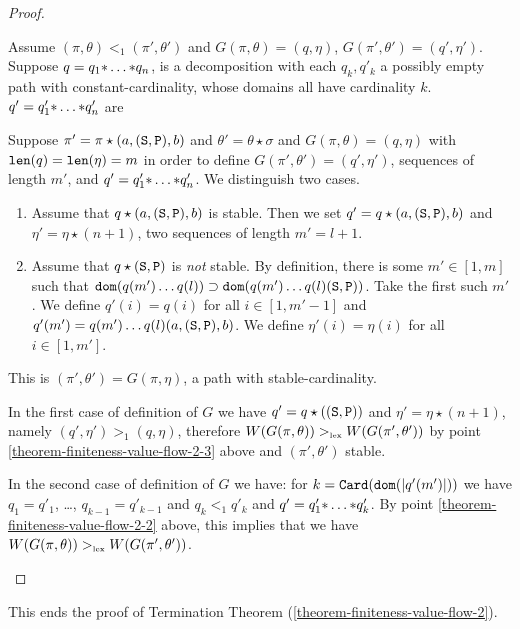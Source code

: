 \documentclass{lmcs}
\begin{document}
\begin{proof}
\begin{enumerate}

Assume $(\pi,\theta) <_1 (\pi',\theta')$ and  $G(\pi,\theta) = (q,\eta)$, 
$G(\pi',\theta') = (q',\eta')$. Suppose $q= q_1 {*} \ldots {*} q_n$,
is a decomposition with each $q_k, q'_k$
a possibly empty path  with constant-cardinality, 
whose domains all have cardinality $k$.
$q' = q'_1 {*} \ldots {*} q'_n$ are 

Suppose $\pi' = \pi \star (a,({\tt S},{\tt P}),b)$ and $\theta' = \theta \star \sigma$
and $G(\pi,\theta) = (q,\eta)$ with ${\mbox{\tt len}}(q) = {\mbox{\tt len}}(\eta) = m$ in order to
define $G(\pi',\theta') = (q',\eta')$, sequences of length $m'$,
and $q' = q'_1 {*} \ldots {*} q'_n$. 
We distinguish two cases.

\begin{enumerate}
\item
Assume that $q \star (a,({\tt S},{\tt P}),b)$ is stable. 
Then we set $q' = q \star (a,({\tt S},{\tt P}),b)$ and $\eta' = \eta \star (n+1)$,
two sequences of length $m' = l+1$. 

\item
Assume that $q \star ({\tt S},{\tt P})$ is \emph{not} stable. 
By definition, there is some $m' \in[1,m]$ such that 
$
{\tt dom}(q(m') \ldots q(l))
\supset 
{\tt dom}(q(m') \ldots q(l) ({\tt S},{\tt P}))
$. Take the first such $m'$.
We define $q'(i) =  q(i)$ for all $i \in [1,m'-1]$ and
$q'(m') = q(m') \ldots q(l)  (a,({\tt S},{\tt P}),b)$.
We define $\eta'(i) = \eta(i)$ for all $i \in [1,m']$. 
\end{enumerate}
This is $(\pi',\theta')=G(\pi,\eta)$, a path with stable-cardinality. 

In the first case of definition of $G$ we have 
$q' = q \star (({\tt S},{\tt P}))$ and $\eta' = \eta \star (n+1)$, namely
$(q',\eta') >_1 (q,\eta)$, therefore $W(G(\pi,\theta)) >_{\mbox{\tiny lex}} W(G(\pi',\theta'))$
by point \ref{theorem-finiteness-value-flow-2-3} 
above and $(\pi',\theta')$ stable.

In the second case of definition of $G$ we have: 
for $k = {\tt Card}({\tt dom}({| q'(m') |}))$ we have 
$q_1 = q'_1$, \ldots, $q_{k-1} = q'_{k-1}$ and $q_k <_1 q'_k$ and 
$q' = q'_1 {*} \ldots {*} q'_k$. By point \ref{theorem-finiteness-value-flow-2-2} above, 
this implies that we have $W(G(\pi,\theta)) >_{\mbox{\tiny lex}} W(G(\pi',\theta'))$.

\end{enumerate}
\end{proof}

This ends the proof of Termination Theorem 
(\ref{theorem-finiteness-value-flow-2}).
\end{document}
